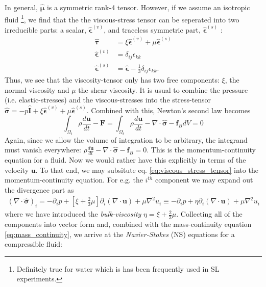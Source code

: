 \documentclass[rmp,aps,nofootinbib,superscriptaddress,floatfix]{revtex4-2}
\begin{document}
In general, $\hat{\bm{\mu}}$ is a symmetric rank-4 tensor. However, if we assume an isotropic fluid \footnote{Definitely true for water which is has been frequently used in SL experiments.}, we find that the the viscous-stress tensor can be seperated into two irreducible parts: a scalar, $\hat{\bm{\epsilon}}^{(v)}$, and traceless symmetric part, $\hat{\bm{\epsilon}}^{(s)}$ \cite{zee2016group,landau1987fluid}:
\begin{equation}
\begin{split}
    \hat{\bm{\tau}} & = \xi \hat{\bm{\epsilon}}^{(v)}+\mu \hat{\bm{\epsilon}}^{(s)} \\
    \hat{\bm{\epsilon}}^{(v)} & = \delta_{ij}\epsilon_{kk} \\
    \hat{\bm{\epsilon}}^{(s)} & = \hat{\bm{\epsilon}}-\frac{1}{3}\delta_{ij}\epsilon_{kk}.
    \label{eq:viscous_stress_tensor}
\end{split}
\end{equation}
Thus, we see that the viscosity-tensor only has two free components: $\xi$, the normal viscosity and $\mu$ the shear viscosity. It is usual to combine the pressure (i.e. elastic-stresses) and the viscous-stresses into the stress-tensor $\hat{\bm{\sigma}}=-p\hat{\bm{I}}+\xi \hat{\bm{\epsilon}}^{(v)}+\mu \hat{\bm{\epsilon}}^{(s)}$. Combined with this, Newton's second law becomes
\begin{equation}
    \int_{\Omega_t} \rho \frac{d \bm{u}}{dt}-\bm{F} = \int_{\Omega_t} \rho \frac{d \bm{u}}{dt} - \nabla \cdot \hat{\bm{\sigma}}-\bm{f}_B dV = 0
\end{equation}
Again, since we allow the volume of integration to be arbitrary, the integrand must vanish everywhere: $\rho \frac{d \bm{u}}{dt} - \nabla \cdot \hat{\bm{\sigma}}-\bm{f}_B=0$. This is the momentum-continuity equation for a fluid. Now we would rather have this explicitly in terms of the velocity $\bm{u}$. To that end, we may subsitute eq. \ref{eq:viscous_stress_tensor} into the momentum-continuity equation. For e.g. the $i^{th}$ component we may expand out the divergence part as 
\begin{equation}
\begin{split}
    \left(\nabla \cdot \hat{\bm{\sigma}}\right)_i = -\partial_i p + \left[\xi +\frac{2}{3}\mu \right] \partial_i(\nabla \cdot \bm{u})+\mu \nabla^2 u_i \equiv -\partial_i p + \eta \partial_i(\nabla \cdot \bm{u})+\mu \nabla^2 u_i
\end{split}
\end{equation}
where we have introduced the \emph{bulk-viscosity} $\eta=\xi+\frac{2}{3}\mu$. Collecting all of the components into vector form and, combined with the mass-continuity equation \ref{eq:mass_continuity}, we arrive at the \emph{Navier-Stokes} (NS) equations for a compressible fluid:
\end{document}
